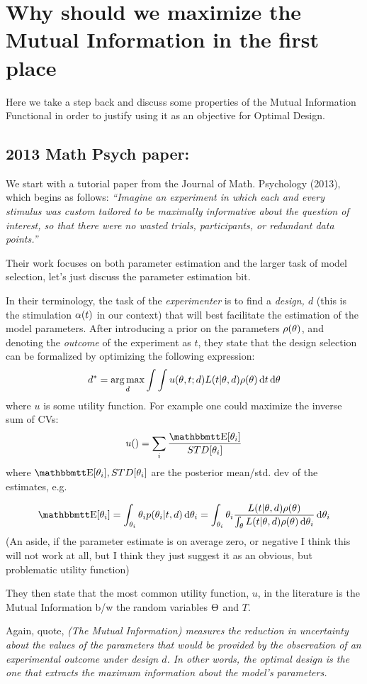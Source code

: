 \documentclass{article}
\begin{document}
\section{Why should we maximize the Mutual Information in the first place}
Here we take a step back and discuss some properties of the Mutual Information
Functional in order to justify using it as an objective for Optimal Design.

\subsection{2013 Math Psych paper: \cite{Myung2013}}
We start with a tutorial paper from the Journal of Math. Psychology (2013),
which begins as follows: { \sl ``Imagine an experiment in which each and every
stimulus was custom tailored to be maximally informative about the question of
interest, so that there were no wasted trials, participants, or redundant data
points.''} 

Their work focuses on both parameter estimation and the larger task of model
selection, let's just discuss the parameter estimation bit. 

In their terminology, the task of the {\sl experimenter}
 is to find a { \sl design, $d$ } (this is the stimulation ${\alpha}(t)$ in our
 context) that will best facilitate the estimation of the model parameters.
 After introducing a prior on the parameters $\rho({\theta})$, and denoting the
 {\sl outcome} of the experiment as $t$, they state that the design selection
 can be formalized by optimizing the following expression: $$
d^* =  \argmax_d \int \int u(\th, t; d) L(t| \th, d) \rho (\th) \intd{t}
\intd{\th}
$$
where $u$ is some utility function. For example one could maximize the inverse
sum of CVs:
$$
u() = \sum_i \frac{\Exp[\th_i]}{STD[\th_i]}
$$
where 
$\Exp[\th_i], STD[\th_i]$ are the posterior mean/std. dev of the estimates, e.g.

$$
\Exp[\th_i] = \int_{\th_i} \th_i p(\th_i| t, d) \intd{\th_i} = 
\int_{\th_i} \th_i \frac{ L(t| \th, d) \rho (\th) }
					    {\int_\th L(t| \th, d) \rho (\th)\intd{\th_i} } \intd{\th_i} 
$$
(An aside, if the parameter estimate is on average zero, or negative I think
this will not work at all, but I think they just suggest it as an obvious, but
problematic utility function)

They then state that the most common utility function, $u$, in the
literature is the Mutual Information b/w the random variables ${\Theta}$ and $T$. 

Again, quote, {\sl (The Mutual Information)  measures the reduction in
uncertainty about the values of the parameters that would be provided by the
observation of an experimental outcome under design $d$. In other words, the
optimal design is the one that extracts the maximum information about the
model's parameters.}
\end{document}
